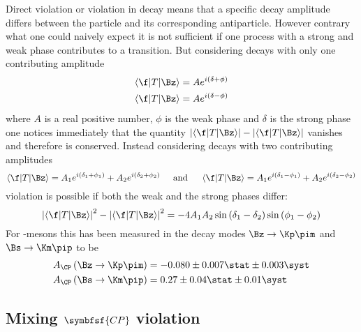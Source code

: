Direct \CP violation or \CP violation in decay means that a specific decay amplitude differs between the particle and  its corresponding antiparticle.
However contrary what one could naively expect it is not sufficient if one process with a strong and weak phase contributes to a transition.
But considering decays with only one contributing amplitude
\begin{equation}
\begin{split}
\left<\f|T|\Bz\right>&=Ae^{i\left(\delta+\phi\right)}\\
\left<\f|T|\Bz\right>&=Ae^{i\left(\delta-\phi\right)}
\end{split}
\end{equation}
where $A$ is a real positive number, $\phi$ is the weak phase and $\delta$ is the strong phase one notices immediately that the quantity $\left|\left<\f|T|\Bz\right>\right|-\left|\left<\f|T|\Bz\right>\right|$ vanishes and therefore \CP is conserved.
Instead considering decays with two contributing amplitudes
\begin{equation}
\left<\f|T|\Bz\right>=A_1e^{i\left(\delta_1+\phi_1\right)}+A_2e^{i\left(\delta_2+\phi_2\right)}\hspace{0.5cm}\text{and}\hspace{0.5cm}\left<\f|T|\Bz\right>=A_1e^{i\left(\delta_1-\phi_1\right)}+A_2e^{i\left(\delta_2-\phi_2\right)}
\end{equation}
\CP violation is possible if both the weak and the strong phases differ:
\begin{equation}
\left|\left<\f|T|\Bz\right>\right|^2-\left|\left<\f|T|\Bz\right>\right|^2=-4A_1A_2\sin\left(\delta_1-\delta_2\right)\sin\left(\phi_1-\phi_2\right)
\end{equation}
For \B-mesons this has been measured in the decay modes $\Bz\to\Kp\pim$ and $\Bs\to\Km\pip$ \cite{LHCb-PAPER-2013-018} to be
\begin{equation}
\begin{split}
A_{\CP}\left(\Bz\to\Kp\pim\right) &= -0.080\pm0.007\stat \pm 0.003\syst\\
A_{\CP}\left(\Bs\to\Km\pip\right) &= 0.27\pm0.04\stat \pm 0.01\syst
\end{split}
\end{equation}


\subsection[head={Mixing \CP violation},tocentry={Mixing \CP violation}]{Mixing $\symbfsf{C{}P}$ violation}
\label{sec:MixingCPV}

